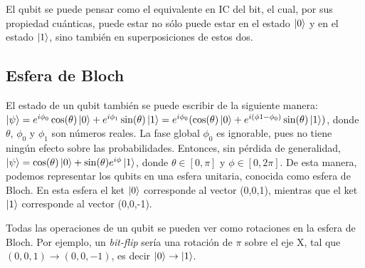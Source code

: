 El qubit se puede pensar como el equivalente en IC del bit, el cual, por sus propiedad cuánticas, puede estar no sólo puede estar en el estado $\ket{0}$ y en el estado $\ket{1}$, sino también en superposiciones de estos dos.

\subsection{Esfera de Bloch}

El estado de un qubit también se puede escribir de la siguiente manera: $ \ket{\psi} = e^{i \phi_0} \cos ( \theta ) \ket{0} + e^{i \phi_1} \sin ( \theta ) \ket{1}  = e^{i \phi_0} (\cos ( \theta ) \ket{0} + e^{i ( \phi1 - \phi_0 )} \sin ( \theta ) \ket{1}) $, donde $ \theta $, $\phi_0$ y $\phi_1$ son números reales. La fase global $\phi_0$ es ignorable, pues no tiene ningún efecto sobre las probabilidades. Entonces, sin pérdida de generalidad, $ \ket{\psi} = \cos ( \theta ) \ket{0} + \sin ( \theta ) e^{i \phi} \ket{1} $, donde $ \theta \in [0, \pi ] $ y $ \phi \in [0, 2 \pi ] $. De esta manera, podemos representar los qubits en una esfera unitaria, conocida como esfera de Bloch. En esta esfera el ket $\ket{0}$ corresponde al vector (0,0,1), mientras que el ket $\ket{1}$ corresponde al vector (0,0,-1).

Todas las operaciones de un qubit se pueden ver como rotaciones en la esfera de Bloch. Por ejemplo, un \textit{bit-flip} sería una rotación de $\pi$ sobre el eje X, tal que $(0,0,1) \rightarrow (0,0,-1)$, es decir $\ket{0} \rightarrow \ket{1}$.

